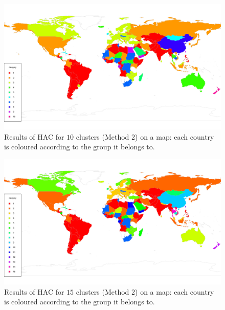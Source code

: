 \documentclass[a4paper,12pt]{article}
\numberwithin{equation}{section}
\begin{document}
\begin{figure}[t!]
\begin{minipage}[t]{0.98\textwidth}
\includegraphics[width=\textwidth]{plots/14days/map_alt_10cl}
\caption{Results of HAC for $10$ clusters (Method 2) on a map: each country is coloured according to the group it belongs to.}\label{fig:map_alt_10cl}
\end{minipage}
\end{figure}


\begin{figure}[t!]
\begin{minipage}[t]{0.98\textwidth}
\includegraphics[width=\textwidth]{plots/14days/map_alt_15cl}
\caption{Results of HAC for $15$ clusters (Method 2) on a map: each country is coloured according to the group it belongs to.}\label{fig:map_alt_15cl}
\end{minipage}
\end{figure}

\newpage 
\FloatBarrier
\end{document}
